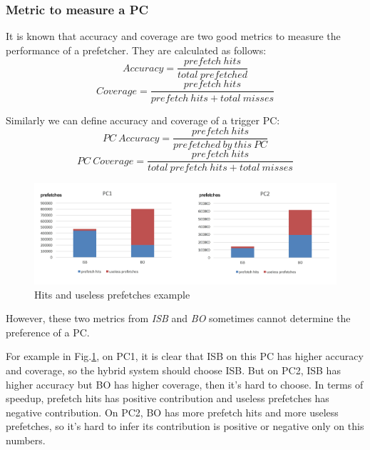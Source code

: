   \subsubsection{Metric to measure a PC}
  \label{sec:metricPC}

  It is known that accuracy and coverage are two good metrics \cite{yalepaper} to measure the performance of a prefetcher. They are calculated as follows:
  \begin{equation}
  Accuracy = \frac{prefetch\ hits}{total\  prefetched}
  \end{equation}
  \begin{equation}
  Coverage = \frac{prefetch\ hits}{prefetch\ hits + total\ misses}
  \end{equation}

  Similarly we can define accuracy and coverage of a trigger PC:
  \begin{equation}
  PC\ Accuracy = \frac{prefetch\ hits}{prefetched\ by\ this\ PC}
  \end{equation}
  \begin{equation}
  PC\ Coverage = \frac{prefetch\ hits}{total\ prefetch\ hits + total\ misses}
 \end{equation}

 \begin{figure}[ht!]
	\centering
	\includegraphics[width=1.0\textwidth]{images/metric.png}
	\caption{Hits and useless prefetches example}
	\label{fig:pcmetric}
\end{figure}

However, these two metrics from \emph{ISB} and \emph{BO} sometimes cannot determine the preference of a PC.

For example in Fig.\ref{fig:pcmetric}, on PC1, it is clear that ISB on this PC has higher accuracy and coverage, so the hybrid system should choose ISB. But on PC2, ISB has higher accuracy but BO has higher coverage, then it's hard to choose. In terms of speedup, prefetch hits has positive contribution and useless prefetches has negative contribution. On PC2, BO has more prefetch hits and more useless prefetches, so it's hard to infer its contribution is positive or negative only on this numbers.

